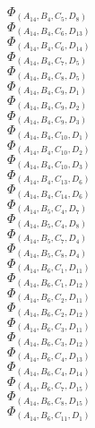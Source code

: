 \documentclass[14pt]{article}
\begin{document}
    $\Phi_{({A}_{14}, {B}_{4}, {C}_{5}, {D}_{8})}$ \\ 
    $\Phi_{({A}_{14}, {B}_{4}, {C}_{6}, {D}_{13})}$ \\ 
    $\Phi_{({A}_{14}, {B}_{4}, {C}_{6}, {D}_{14})}$ \\ 
    $\Phi_{({A}_{14}, {B}_{4}, {C}_{7}, {D}_{5})}$ \\ 
    $\Phi_{({A}_{14}, {B}_{4}, {C}_{8}, {D}_{5})}$ \\ 
    $\Phi_{({A}_{14}, {B}_{4}, {C}_{9}, {D}_{1})}$ \\ 
    $\Phi_{({A}_{14}, {B}_{4}, {C}_{9}, {D}_{2})}$ \\ 
    $\Phi_{({A}_{14}, {B}_{4}, {C}_{9}, {D}_{3})}$ \\ 
    $\Phi_{({A}_{14}, {B}_{4}, {C}_{10}, {D}_{1})}$ \\ 
    $\Phi_{({A}_{14}, {B}_{4}, {C}_{10}, {D}_{2})}$ \\ 
    $\Phi_{({A}_{14}, {B}_{4}, {C}_{10}, {D}_{3})}$ \\ 
    $\Phi_{({A}_{14}, {B}_{4}, {C}_{13}, {D}_{6})}$ \\ 
    $\Phi_{({A}_{14}, {B}_{4}, {C}_{14}, {D}_{6})}$ \\ 
    $\Phi_{({A}_{14}, {B}_{5}, {C}_{4}, {D}_{7})}$ \\ 
    $\Phi_{({A}_{14}, {B}_{5}, {C}_{4}, {D}_{8})}$ \\ 
    $\Phi_{({A}_{14}, {B}_{5}, {C}_{7}, {D}_{4})}$ \\ 
    $\Phi_{({A}_{14}, {B}_{5}, {C}_{8}, {D}_{4})}$ \\ 
    $\Phi_{({A}_{14}, {B}_{6}, {C}_{1}, {D}_{11})}$ \\ 
    $\Phi_{({A}_{14}, {B}_{6}, {C}_{1}, {D}_{12})}$ \\ 
    $\Phi_{({A}_{14}, {B}_{6}, {C}_{2}, {D}_{11})}$ \\ 
    $\Phi_{({A}_{14}, {B}_{6}, {C}_{2}, {D}_{12})}$ \\ 
    $\Phi_{({A}_{14}, {B}_{6}, {C}_{3}, {D}_{11})}$ \\ 
    $\Phi_{({A}_{14}, {B}_{6}, {C}_{3}, {D}_{12})}$ \\ 
    $\Phi_{({A}_{14}, {B}_{6}, {C}_{4}, {D}_{13})}$ \\ 
    $\Phi_{({A}_{14}, {B}_{6}, {C}_{4}, {D}_{14})}$ \\ 
    $\Phi_{({A}_{14}, {B}_{6}, {C}_{7}, {D}_{15})}$ \\ 
    $\Phi_{({A}_{14}, {B}_{6}, {C}_{8}, {D}_{15})}$ \\ 
    $\Phi_{({A}_{14}, {B}_{6}, {C}_{11}, {D}_{1})}$ \\ 
\end{document}
